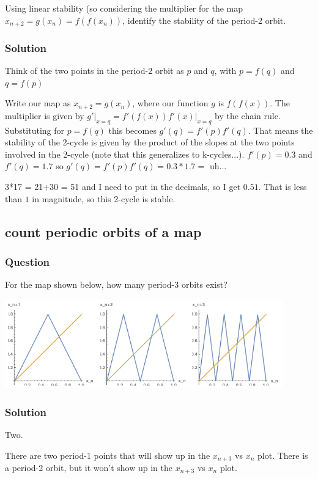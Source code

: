 \documentclass[12pt,letterpaper,noanswers]{exam}
\begin{document}
Using linear stability (so considering the  multiplier for the map $x_{n+2} = g(x_n) = f(f(x_n))$, identify the stability of the period-2 orbit.

\subsubsection{Solution}
Think of the two points in the period-$2$ orbit as $p$ and $q$, with $p = f(q)$ and $q = f(p)$

Write our map as $x_{n+2} = g(x_n)$, where our function $g$ is $f(f(x))$.  The multiplier is given by $\left.g'\right\vert_{x=q} = \left.f'(f(x))f'(x)\right\vert_{x=q}$ by the chain rule.  Substituting for $p = f(q)$ this becomes $g'(q) = f'(p)f'(q)$.  That means the stability of the 2-cycle is given by the product of the slopes at the two points involved in the 2-cycle (note that this generalizes to k-cycles...).  $f'(p) = 0.3$ and $f'(q) = 1.7$ so $g'(q) = f'(p)f'(q) = 0.3*1.7 = $ uh...

3*17 = 21+30 = 51 and I need to put in the decimals, so I get $0.51$.  That is less than $1$ in magnitude, so this 2-cycle is stable.

\subsection{count periodic orbits of a map}
\subsubsection{Question}
For the map shown below, how many period-3 orbits exist?

\includegraphics[width=0.9\textwidth]{img/C25-26p1a.png}


\subsubsection{Solution}
Two.

There are two period-1 points that will show up in the $x_{n+3}$ vs $x_n$ plot.  There is a period-2 orbit, but it won't show up in the $x_{n+3}$ vs $x_n$ plot.
\end{document}
